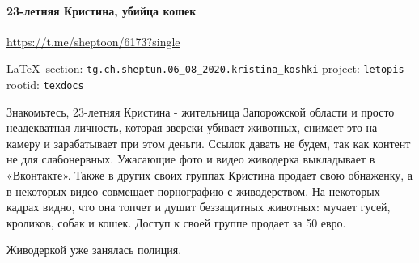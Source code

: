  
 
\paragraph{23-летняя Кристина, убийца кошек}
\label{sec:tg.ch.sheptun.06_08_2020.kristina_koshki}
\url{https://t.me/sheptoon/6173?single}
  
\vspace{0.5cm}
 {\ifDEBUG\small\LaTeX~section: \verb|tg.ch.sheptun.06_08_2020.kristina_koshki| project: \verb|letopis| rootid: \verb|texdocs|	\fi}
\vspace{0.5cm}

Знакомьтесь, 23-летняя Кристина - жительница Запорожской области и просто
неадекватная личность, которая зверски убивает животных, снимает это на камеру
и зарабатывает при этом деньги. Ссылок давать не будем, так как контент не для
слабонервных.  Ужасающие фото и видео живодерка выкладывает в  «Вконтакте».
Также в других своих группах Кристина продает свою обнаженку, а в некоторых
видео совмещает порнографию с живодерством. На некоторых кадрах видно, что она
топчет и душит беззащитных животных: мучает гусей, кроликов, собак и кошек.
Доступ к своей группе продает за 50 евро. 

Живодеркой уже занялась полиция.
  
